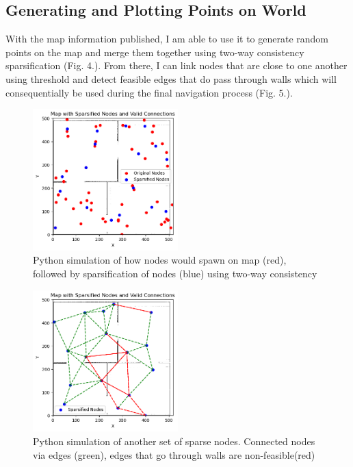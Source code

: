 \documentclass[conference]{IEEEtran}
\begin{document}
\subsection{Generating and Plotting Points on World}
With the map information published, I am able to use it to generate random points on the map and merge them together using two-way consistency sparsification (Fig. 4.). From there, I can link nodes that are close to one another using threshold and detect feasible edges that do pass through walls which will consequentially be used during the final navigation process (Fig. 5.).

\begin{figure}[h]
  \centering
  \includegraphics[width=0.5\textwidth]{../assets/map_nodes_1.png}
  \caption{Python simulation of how nodes would spawn on map (red), followed by sparsification of nodes (blue) using two-way consistency}
  \label{fig:example}
\end{figure}
\begin{figure}[h]
  \centering
  \includegraphics[width=0.5\textwidth]{../assets/map_nodes_2.png}
  \caption{Python simulation of another set of sparse nodes. Connected nodes via edges (green), edges that go through walls are non-feasible(red)}
  \label{fig:example}
\end{figure}
\end{document}
